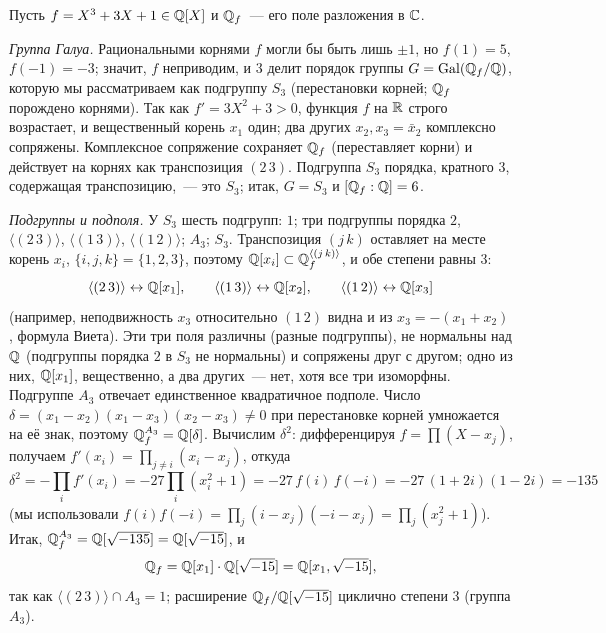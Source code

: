 \begin{example}[3.23c]
Пусть $f=X^3+3X+1\in\mathbb Q[X]$ и $\mathbb Q_f$~--- его поле разложения в $\mathbb C$.

\emph{Группа Галуа.} Рациональными корнями $f$ могли бы быть лишь $\pm1$, но $f(1)=5$, $f(-1)=-3$; значит, $f$ неприводим, и $3$
делит порядок группы $G=\operatorname{Gal}(\mathbb Q_f/\mathbb Q)$, которую мы рассматриваем как подгруппу $S_3$ (перестановки корней; $\mathbb Q_f$ порождено
корнями). Так как $f'=3X^2+3>0$, функция $f$ на $\mathbb R$ строго возрастает, и вещественный корень $x_1$ один; два других $x_2,x_3=\bar x_2$
комплексно сопряжены. Комплексное сопряжение сохраняет $\mathbb Q_f$ (переставляет корни) и действует на корнях как транспозиция
$(2\,3)$. Подгруппа $S_3$ порядка, кратного $3$, содержащая транспозицию,~--- это $S_3$; итак, $G=S_3$ и $[\mathbb Q_f:\mathbb Q]=6$.

\emph{Подгруппы и подполя.} У $S_3$ шесть подгрупп: $1$; три подгруппы порядка $2$, $\langle(2\,3)\rangle$, $\langle(1\,3)\rangle$,
$\langle(1\,2)\rangle$; $A_3$; $S_3$. Транспозиция $(j\,k)$ оставляет на месте корень $x_i$, $\{i,j,k\}=\{1,2,3\}$, поэтому
$\mathbb Q[x_i]\subset\mathbb Q_f^{\langle(j\,k)\rangle}$, и обе степени равны $3$:
\[
\langle(2\,3)\rangle\leftrightarrow\mathbb Q[x_1],\qquad\langle(1\,3)\rangle\leftrightarrow\mathbb Q[x_2],\qquad\langle(1\,2)\rangle\leftrightarrow\mathbb Q[x_3]
\]
(например, неподвижность $x_3$ относительно $(1\,2)$ видна и из $x_3=-(x_1+x_2)$, формула Виета). Эти три поля различны
(разные подгруппы), не нормальны над $\mathbb Q$ (подгруппы порядка $2$ в $S_3$ не нормальны) и сопряжены друг с другом; одно из
них, $\mathbb Q[x_1]$, вещественно, а два других~--- нет, хотя все три изоморфны. Подгруппе $A_3$ отвечает единственное
квадратичное подполе. Число $\delta=(x_1-x_2)(x_1-x_3)(x_2-x_3)\ne0$ при перестановке корней умножается на её знак,
поэтому $\mathbb Q_f^{A_3}=\mathbb Q[\delta]$. Вычислим $\delta^2$: дифференцируя $f=\prod(X-x_j)$, получаем $f'(x_i)=\prod_{j\ne i}(x_i-x_j)$, откуда
\[
\delta^2=-\prod_{i}f'(x_i)=-27\prod_i(x_i^2+1)=-27\,f(i)\,f(-i)=-27\,(1+2i)(1-2i)=-135
\]
(мы использовали $f(i)f(-i)=\prod_j(i-x_j)(-i-x_j)=\prod_j(x_j^2+1)$). Итак, $\mathbb Q_f^{A_3}=\mathbb Q[\sqrt{-135}]=\mathbb Q[\sqrt{-15}]$, и
\[
\mathbb Q_f=\mathbb Q[x_1]\cdot\mathbb Q[\sqrt{-15}]=\mathbb Q[x_1,\sqrt{-15}],
\]
так как $\langle(2\,3)\rangle\cap A_3=1$; расширение $\mathbb Q_f/\mathbb Q[\sqrt{-15}]$ циклично степени $3$ (группа $A_3$).


\end{example}
